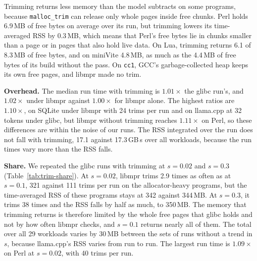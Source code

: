 \documentclass[11pt]{article}
\newcommand{\tabref}[1]{Table~\ref{#1}}
\begin{document}
Trimming returns less memory than the model subtracts on some programs, because \texttt{malloc\_trim} can release
only whole pages inside free chunks. Perl holds 6.9\,MB of free bytes on average over its run, but trimming lowers
its time-averaged RSS by 0.3\,MB, which means that Perl's free bytes lie in chunks smaller than a page or in pages
that also hold live data. On Lua, trimming returns 6.1 of 8.3\,MB of free bytes, and on miniVite 4.8\,MB, as much as
the 4.4\,MB of free bytes of its build without the pass. On \texttt{cc1},
GCC's garbage-collected heap keeps its own free pages, and libmpr made no trim.

\textbf{Overhead.} The median run time with trimming is $1.01\times$ the glibc run's, and $1.02\times$ under libmpr
against $1.00\times$ for libmpr alone. The highest ratios are $1.10\times$, on SQLite under libmpr with 24 trims per
run and on llama.cpp at 32 tokens under glibc, but libmpr without trimming reaches $1.11\times$ on Perl, so these
differences are within the noise of our runs. The RSS integrated over the run does not fall with
trimming, 17.1 against 17.3\,GB\,s over all workloads, because the run times vary more than the RSS falls.

\begin{table}[t]
\centering
\small
\caption{Trimming under glibc at three shares $s$: the trims per run summed over the allocator-heavy programs, the
time-averaged RSS summed over the allocator-heavy programs and over all 29 workloads (MB), and the run time over the
glibc run's in the same set of runs ($\times$), median and largest over the workloads, mean of 3 runs. The untrimmed
row and the row at $s = 0.1$ come from the same runs.}
\label{tab:trim-share}
\setlength{\tabcolsep}{4pt}

\end{table}

\textbf{Share.} We repeated the glibc runs with trimming at $s = 0.02$ and $s = 0.3$ (\tabref{tab:trim-share}). At
$s = 0.02$, libmpr trims 2.9 times as often as at $s = 0.1$, 321 against 111 trims per run on the allocator-heavy
programs, but the time-averaged RSS of these programs stays at 342 against 344\,MB. At $s = 0.3$, it trims 38 times
and the RSS falls by half as much, to 350\,MB. The memory that trimming returns is therefore limited by the whole free
pages that glibc holds and not by how often libmpr checks, and $s = 0.1$ returns nearly all of them. The total over
all 29 workloads varies by 30\,MB between the sets of runs without a trend in $s$, because llama.cpp's RSS varies
from run to run. The largest run time is $1.09\times$ on Perl at $s = 0.02$, with 40 trims per run.
\end{document}
